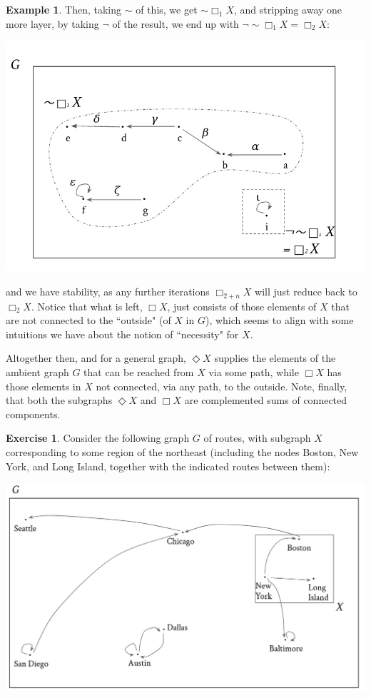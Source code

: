 \documentclass[a4paper]{book}
\theoremstyle{definition}
\newtheorem{example}{Example}[section]
\theoremstyle{definition}
\theoremstyle{definition}
\theoremstyle{theorem}
\theoremstyle{definition}
\newtheorem{exercise}{Exercise}[section]
\begin{document}
\begin{example}
	Then, taking $\sim$ of this, we get $\sim \Box_1 X$, and stripping away one more layer, by taking $\neg$ of the result, we end up with $\neg \sim \Box_1 X = \Box_2 X$:
	\begin{center}
		\includegraphics*[scale=0.24]{GraphSubgraphNegation13.png}
	\end{center}  
	and we have stability, as any further iterations $\Box_{2 +n} X$ will just reduce back to $\Box_2 X$. Notice that what is left, $\Box X$, just consists of those elements of $X$ that are not connected to the ``outside" (of $X$ in $G$), which seems to align with some intuitions we have about the notion of ``necessity" for $X$.  \par 
	Altogether then, and for a general graph, $\Diamond X$ supplies the elements of the ambient graph $G$ that can be reached from $X$ via some path, while $\Box X$ has those elements in $X$ not connected, via any path, to the outside. Note, finally, that both the subgraphs $\Diamond X$ and $\Box X$ are complemented sums of connected components.   
	\begin{exercise} Consider the following graph $G$ of routes, with subgraph $X$ corresponding to some region of the northeast (including the nodes Boston, New York, and Long Island, together with the indicated routes between them): 
	\begin{center}
		\includegraphics*[scale=0.2]{RoutesGraph.png}

\end{center}
\end{exercise}
\end{example}
\end{document}
